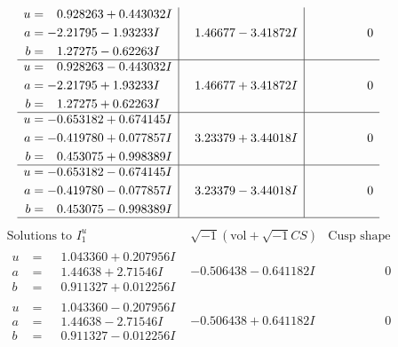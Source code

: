\documentclass[1p]{elsarticle_modified}
\theoremstyle{definition}
\newcommand{\I}{\sqrt{-1}}
\begin{document}
$$\begin{array}{c|c|c}
\begin{aligned}
u &= \phantom{-}0.928263 + 0.443032 I \\
a &= -2.21795 - 1.93233 I \\
b &= \phantom{-}1.27275 - 0.62263 I\end{aligned}
 & \phantom{-}1.46677 - 3.41872 I & \phantom{-0.000000 } 0 \\ \hline\begin{aligned}
u &= \phantom{-}0.928263 - 0.443032 I \\
a &= -2.21795 + 1.93233 I \\
b &= \phantom{-}1.27275 + 0.62263 I\end{aligned}
 & \phantom{-}1.46677 + 3.41872 I & \phantom{-0.000000 } 0 \\ \hline\begin{aligned}
u &= -0.653182 + 0.674145 I \\
a &= -0.419780 + 0.077857 I \\
b &= \phantom{-}0.453075 + 0.998389 I\end{aligned}
 & \phantom{-}3.23379 + 3.44018 I & \phantom{-0.000000 } 0 \\ \hline\begin{aligned}
u &= -0.653182 - 0.674145 I \\
a &= -0.419780 - 0.077857 I \\
b &= \phantom{-}0.453075 - 0.998389 I\end{aligned}
 & \phantom{-}3.23379 - 3.44018 I & \phantom{-0.000000 } 0\\
 \hline 
 \end{array}$$\newpage$$\begin{array}{c|c|c}  
\text{Solutions to }I^u_{1}& \I (\text{vol} + \sqrt{-1}CS) & \text{Cusp shape}\\
 \hline 
\begin{aligned}
u &= \phantom{-}1.043360 + 0.207956 I \\
a &= \phantom{-}1.44638 + 2.71546 I \\
b &= \phantom{-}0.911327 + 0.012256 I\end{aligned}
 & -0.506438 - 0.641182 I & \phantom{-0.000000 } 0 \\ \hline\begin{aligned}
u &= \phantom{-}1.043360 - 0.207956 I \\
a &= \phantom{-}1.44638 - 2.71546 I \\
b &= \phantom{-}0.911327 - 0.012256 I\end{aligned}
 & -0.506438 + 0.641182 I & \phantom{-0.000000 } 0 \\ \hline\begin{aligned}

\end{aligned}
\end{array}$$
\end{document}
